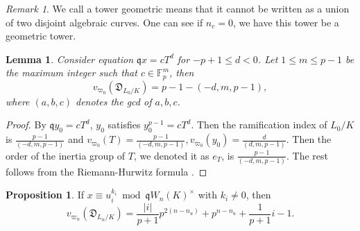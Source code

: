 \documentclass{proc-l}
\newtheorem{lemma}[theorem]{Lemma}
\theoremstyle{definition}
\newtheorem{proposition}[theorem]{Proposition}
\theoremstyle{remark}
\newtheorem{remark}[theorem]{Remark}
\numberwithin{equation}{section}
\begin{document}
\begin{remark}
We call a tower geometric means that it cannot be written as a union of two disjoint algebraic curves. One can see if $n_c=0$, we have this tower be a geometric tower.
\end{remark}
\begin{lemma}\label{5.14}
    Consider equation $\mathfrak qx=cT^d$ for $-p+1\leq d<0$. Let $1\leq m\leq p-1$ be the maximum integer such that $c\in\mathbb F_p^m$, then
    $$v_{\varpi_{0}}(\mathfrak D_{L_{0}/K})=p-1-{(-d,m,p-1)},$$
    where $(a,b,c)$ denotes the gcd of $a,b,c$.
    
\end{lemma}
\begin{proof}
    By $\mathfrak qy_0=cT^d$, $y_0$ satisfies $y_0^{p-1}=cT^d$. Then the ramification index of $L_{0}/K$ is $\frac{p-1}{(-d,m,p-1)}$ and $v_{\varpi_0}(T)=\frac{p-1}{(-d,m,p-1)},v_{\varpi_0}(y_0)=\frac{d}{(d,m,p-1)}$. Then the order of the inertia group of $T$, we denoted it as $e_T$, is $\frac{p-1}{(-d,m,p-1)}$. The rest follows from the Riemann-Hurwitz formula \cite[Theorem 3.4.13]{SH}.
\end{proof}
\begin{proposition}\label{4.12}
    If $x\equiv u_i^{k_i}\bmod \mathfrak qW_n(K)^\times$ with $k_i\neq0$, then $$v_{\varpi_n}(\mathfrak D_{L_{n}/K})=\frac{|i|}{p+1}p^{2(n-n_u)}+p^{n-n_u}+\frac{1}{p+1}i-1.$$
\end{proposition}
\end{document}

